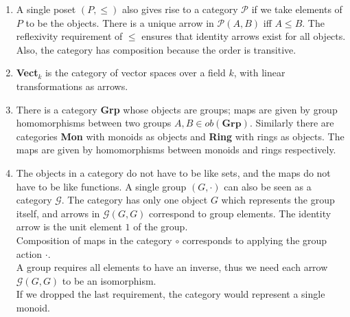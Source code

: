 \begin {enumerate}
 \item A single poset $(P, \leq)$ also gives rise to a category $\mathscr{P}$ if we take elements of $P$ to be the objects.
   There is a unique arrow in $\mathscr{P}(A, B)$ iff $A \leq B$.
   The reflexivity requirement of $\leq$ ensures that identity arrows exist for all objects. Also, the category has composition because the order is transitive.
  
  \item \textbf{Vect$_k$} is the category of vector spaces over a field $k$, with linear transformations as arrows.
  
  \item There is a category \textbf{Grp} whose objects are groups; maps are given by group homomorphisms between two groups $A,B \in ob(\textbf{Grp}).$
    Similarly there are categories \textbf{Mon} with monoids as objects and \textbf{Ring} with rings as objects.
    The maps are given by homomorphisms between monoids and rings respectively.
  
  \item
    The objects in a category do not have to be like sets, and the maps do not have to be like functions.
    A single group $(G, \cdot)$ can also be seen as a category $\mathcal{G}$. The category has only one object $G$ which represents the group itself,
    and arrows in $\mathcal{G}(G, G)$  correspond to group elements.
    The identity arrow is the unit element $1$ of the group.\\
    Composition of maps in the category $\circ$ corresponds to applying the group action $\cdot$.\\
    A group requires all elements to have an inverse, thus we need each arrow $\mathcal{G}(G, G)$ to be an isomorphism.\\
    If we dropped the last requirement, the category would represent a single monoid.
  

\end{enumerate}
